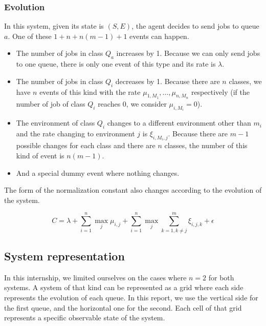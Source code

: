 \documentclass[
  a4paper, xcolor = usenames,dvipsnames]{article}
\providecommand{\tightlist}{%
  \setlength{\itemsep}{0pt}\setlength{\parskip}{0pt}}
\theoremstyle{definition}
\theoremstyle{definition}
\theoremstyle{definition}
\theoremstyle{definition}
\theoremstyle{remark}
\begin{document}
\hypertarget{evolution-1}{%
\subsubsection{Evolution}\label{evolution-1}}

In this system, given its state is \((S, E)\), the agent decides to send jobs to queue \(a\). One of these \(1 + n + n(m - 1) + 1\) events can happen.

\begin{itemize}
\tightlist
\item
  The number of jobs in class \(Q_{a}\) increases by 1. Because we can only send jobs to one queue, there is only one event of this type and its rate is \(\lambda\).
\item
  The number of jobs in class \(Q_{i}\) decreases by 1. Because there are \(n\) classes, we have \(n\) events of this kind with the rate \(\mu_{1, M_{1}}, \dots, \mu_{n, M_{n}}\) respectively (if the number of job of class \(Q_{i}\) reaches 0, we consider \(\mu_{i, M_{i}} = 0\)).
\item
  The environment of class \(Q_{i}\) changes to a different environment other than \(m_{i}\) and the rate changing to environment \(j\) is \(\xi_{i, M_{i}, j}\). Because there are \(m - 1\) possible changes for each class and there are \(n\) classes, the number of this kind of event is \(n(m - 1)\).
\item
  And a special dummy event where nothing changes.
\end{itemize}

The form of the normalization constant also changes according to the evolution of the system.

\[
C = \lambda + \sum_{i = 1}^{n} \max_{j} \mu_{i, j} + \sum_{i = 1}^{n} \max_{j} \sum_{k = 1, k \neq j}^{m} \xi_{i, j, k} + \epsilon
\]

\hypertarget{system-representation}{%
\subsection{System representation}\label{system-representation}}

In this internship, we limited ourselves on the cases where \(n = 2\) for both systems. A system of that kind can be represented as a grid where each side represents the evolution of each queue. In this report, we use the vertical side for the first queue, and the horizontal one for the second. Each cell of that grid represents a specific observable state of the system.
\end{document}
